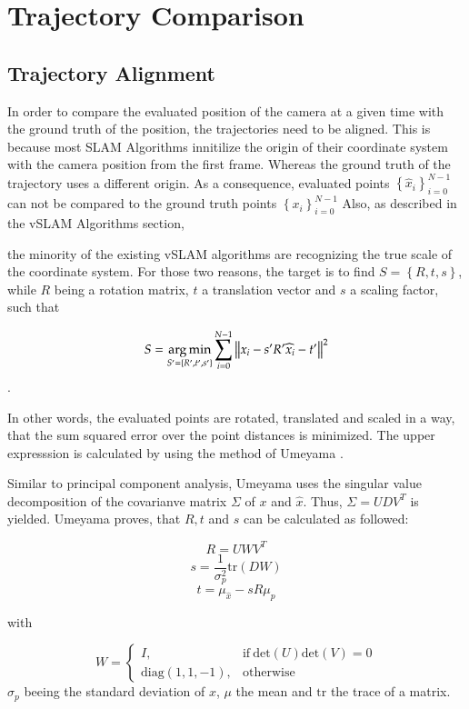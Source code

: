 \section{Trajectory Comparison}

	\subsection{Trajectory Alignment}
	
	In order to compare the evaluated position of the camera at a given time with the ground truth of the 
	position, the trajectories need to be aligned. This is because most SLAM Algorithms innitilize the origin
	of their coordinate system with the camera position from the first frame. Whereas the ground truth of the 
	trajectory uses a different origin. As a consequence, evaluated points $ \left\{{\widehat{x}_i}\right\}_{i=0}^{N-1}$ can not be 
	compared to the ground truth points $\left\{{x_i}\right\}_{i=0}^{N-1}$
	Also, as described in the vSLAM Algorithms section,
	
	
	the minority of the existing vSLAM algorithms are recognizing the true scale of the coordinate system. For
	those two reasons, the target is to find $S = \left\{R,t,s\right\}$, while $R$ being a rotation matrix, $t$ a translation vector
	and $s$ a scaling factor, 
	such that
	
	$$ S = \mathop{\mathrm{arg\,min}}_{S' = \left\{R', t', s' \right\}} \sum_{i = 0}^{N-1} \left\lVert x_i - s'R'\widehat{x}_i - t'\right\rVert^2 $$ .
	
	In other words, the evaluated points are rotated, translated and scaled in a way, that the sum squared error over the point
	distances is minimized. The upper expresssion is calculated by using the method of Umeyama \cite{ume}. 
	
	Similar to principal component analysis, Umeyama uses the singular value decomposition of the covarianve 
	matrix $\Sigma$ of $x$ and $\widehat{x}$. Thus, 
	$\Sigma = UDV^T$ is yielded. Umeyama proves, that $R,t$ and $s$ can be calculated as followed: 
	
	$$ R = UWV^T $$
	$$ s = \frac{1}{\sigma^2_p}\text{tr}\left(DW\right)$$
	$$ t = \mu_{\widehat{x}} - sR\mu_p $$
	
	with 
	
	$$ W = \begin{cases}
      I, & \text{if}\ \text{det}\left(U\right)\text{det}\left(V\right) =0 \\
      \text{diag}\left(1,1,-1\right), & \text{otherwise}
    \end{cases}$$
	$\sigma_p$ beeing the standard deviation of $x$, $\mu$ the mean and $\text{tr}$ the trace of a matrix. 
	
